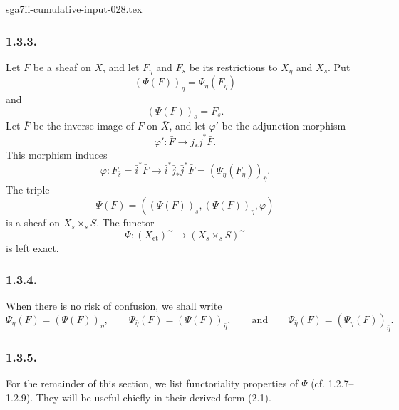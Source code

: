 \begin{filecontents*}{sga7ii-cumulative-input-028.tex}
\subsubsection*{1.3.3.}
Let $F$ be a sheaf on $X$, and let $F_\eta$ and $F_s$ be its
restrictions to $X_\eta$ and $X_s$.  Put
\begin{equation}\tag{1.3.3.1}
(\Psi(F))_\eta=\Psi_\eta(F_\eta)
\end{equation}
and
\begin{equation}\tag{1.3.3.2}
(\Psi(F))_s=F_s.
\end{equation}
Let $\bar F$ be the inverse image of $F$ on $\bar X$, and let
$\varphi'$ be the adjunction morphism
\begin{equation*}
\varphi':\bar F\longrightarrow\bar j_*\bar j^*\bar F.
\end{equation*}
This morphism induces
\begin{equation*}
\varphi:F_{\bar s}=\bar i^*\bar F
\longrightarrow
\bar i^*\bar j_*\bar j^*\bar F
=(\Psi_\eta(F_\eta))_{\bar\eta}.
\end{equation*}
The triple
\begin{equation*}
\Psi(F)=((\Psi(F))_s,(\Psi(F))_\eta,\varphi)
\end{equation*}
is a sheaf on $X_s\times_sS$.  The functor
\begin{equation}\tag{1.3.3.3}
\Psi:(X_{\mathrm{et}})^{\sim}
\longrightarrow(X_s\times_sS)^{\sim}
\end{equation}
is left exact.

\subsubsection*{1.3.4.}
When there is no risk of confusion, we shall write
\begin{equation*}
\Psi_\eta(F)=(\Psi(F))_\eta,
\qquad
\Psi_{\bar\eta}(F)=(\Psi(F))_{\bar\eta},
\qquad\text{and}\qquad
\Psi_{\bar\eta}(F)=(\Psi_\eta(F))_{\bar\eta}.
\end{equation*}

\subsubsection*{1.3.5.}
For the remainder of this section, we list functoriality properties of
$\Psi$ (cf. 1.2.7--1.2.9).  They will be useful chiefly in their
derived form (2.1).


\end{filecontents*}
